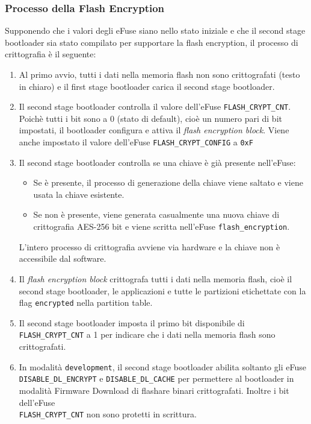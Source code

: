 \documentclass[a4paper]{article}
\begin{document}
\subsubsection{Processo della Flash Encryption}
Supponendo che i valori degli eFuse siano nello stato iniziale e che il second stage
bootloader sia stato compilato per supportare la flash encryption, il processo di crittografia
è il seguente:
\begin{enumerate}
  \item Al primo avvio, tutti i dati nella memoria flash non sono crittografati (testo
    in chiaro) e il first stage bootloader carica il second stage bootloader.

  \item Il second stage bootloader controlla il valore dell'eFuse
    \texttt{FLASH\_CRYPT\_CNT}. Poichè tutti i bit sono a 0 (stato di default),
    cioè un numero pari di bit impostati, il bootloader configura e attiva il \textit{
      flash encryption block}. Viene anche impostato il valore dell'eFuse
    \texttt{FLASH\_CRYPT\_CONFIG} a \texttt{0xF}

  \item Il second stage bootloader controlla se una chiave è già presente nell'eFuse:
    \begin{itemize}
      \item Se è presente, il processo di generazione della chiave viene saltato e viene
        usata la chiave esistente.

      \item Se non è presente, viene generata casualmente una nuova chiave di crittografia
        AES-256 bit e viene scritta nell'eFuse \texttt{flash\_encryption}.
    \end{itemize}
    L'intero processo di crittografia avviene via hardware e la chiave non è accessibile
    dal software.

  \item Il \textit{flash encryption block} crittografa tutti i dati nella memoria flash,
    cioè il second stage bootloader, le applicazioni e tutte le partizioni etichettate
    con la flag \texttt{encrypted} nella partition table.

  \item Il second stage bootloader imposta il primo bit disponibile di \\
    \texttt{FLASH\_CRYPT\_CNT} a 1 per indicare che i dati nella memoria flash sono
    crittografati. 

  \item In modalità \texttt{development}, il second stage bootloader abilita soltanto
    gli eFuse \texttt{DISABLE\_DL\_ENCRYPT} e \texttt{DISABLE\_DL\_CACHE} per
    permettere al bootloader in modalità Firmware Download di flashare binari crittografati.
    Inoltre i bit dell'eFuse \\ \texttt{FLASH\_CRYPT\_CNT} non sono protetti in scrittura.


\end{enumerate}
\end{document}
